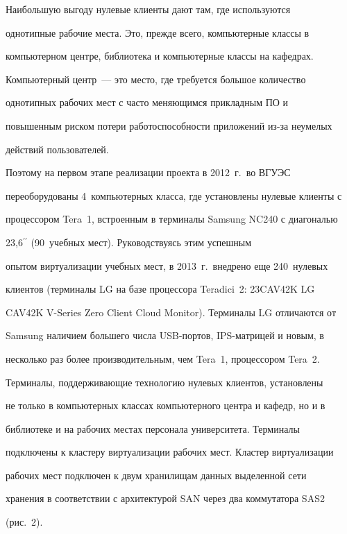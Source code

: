   

  Наибольшую выгоду нулевые клиенты дают там, где используются 

однотипные рабочие места. Это, прежде всего, компьютерные классы в 

компьютерном центре, библиотека и компьютерные классы на кафедрах. 

Компьютерный центр~--- это место, где требуется большое количество 

однотипных рабочих мест с часто меняющимся прикладным ПО и 

повышенным риском потери работоспособности приложений из-за неумелых 

действий пользователей.

%  

   Поэтому на первом этапе реализации проекта в 2012~г.\ во ВГУЭС 

переоборудованы 4~компьютерных класса, где установлены нулевые клиенты с 

процессором Tera~1, встроенным в терминалы Samsung NC240 с диагональю 

23,6$^{\prime\prime}$ (90~учебных мест). Руководствуясь этим успешным 

опытом виртуализации учебных мест, в 2013~г.\ внедрено еще 240~нулевых 

клиентов (терминалы LG на базе процессора Teradici~2: 23CAV42K LG 

CAV42K V-Series Zero Client Cloud Monitor). Терминалы LG отличаются от 

Samsung наличием большего числа USB-пор\-тов, IPS-мат\-ри\-цей и новым, в 

несколько раз более производительным, чем Tera~1, процессором Tera~2. 

  

  Терминалы, поддерживающие технологию нулевых клиентов, установлены 

не только в компьютерных классах компьютерного центра и кафедр, но и в 

библиотеке и на рабочих местах персонала университета. Терминалы 

подключены к кластеру виртуализации рабочих мест. Кластер виртуализации 

рабочих мест подключен к двум хранилищам данных выделенной сети 

хранения в соответствии с архитектурой SAN через два коммутатора SAS2 

(рис.~2). 

    


